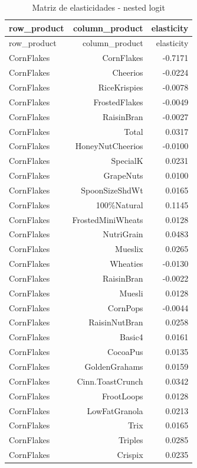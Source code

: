 \begingroup
\scriptsize
\begin{longtable}{@{}lrr@{}}
\caption{Matriz de elasticidades - nested logit}\label{tab:elas-nested}\\
\toprule
row\_product & column\_product & elasticity \\
\midrule
\endfirsthead
\toprule
row\_product & column\_product & elasticity \\
\midrule
\endhead
CornFlakes & CornFlakes & -0.7171 \\
CornFlakes & Cheerios & -0.0224 \\
CornFlakes & RiceKrispies & -0.0078 \\
CornFlakes & FrostedFlakes & -0.0049 \\
CornFlakes & RaisinBran & -0.0027 \\
CornFlakes & Total & 0.0317 \\
CornFlakes & HoneyNutCheerios & -0.0100 \\
CornFlakes & SpecialK & 0.0231 \\
CornFlakes & GrapeNuts & 0.0100 \\
CornFlakes & SpoonSizeShdWt & 0.0165 \\
CornFlakes & 100\%Natural & 0.1145 \\
CornFlakes & FrostedMiniWheats & 0.0128 \\
CornFlakes & NutriGrain & 0.0483 \\
CornFlakes & Mueslix & 0.0265 \\
CornFlakes & Wheaties & -0.0130 \\
CornFlakes & RaisinBran & -0.0022 \\
CornFlakes & Muesli & 0.0128 \\
CornFlakes & CornPops & -0.0044 \\
CornFlakes & RaisinNutBran & 0.0258 \\
CornFlakes & Basic4 & 0.0161 \\
CornFlakes & CocoaPus & 0.0135 \\
CornFlakes & GoldenGrahams & 0.0159 \\
CornFlakes & Cinn.ToastCrunch & 0.0342 \\
CornFlakes & FrootLoops & 0.0128 \\
CornFlakes & LowFatGranola & 0.0213 \\
CornFlakes & Trix & 0.0165 \\
CornFlakes & Triples & 0.0285 \\
CornFlakes & Crispix & 0.0235 \\

\end{longtable}
